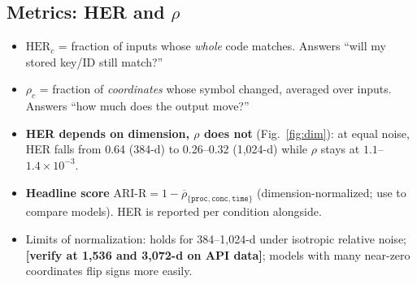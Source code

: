 \documentclass{article}
\newcommand{\todo}[1]{\textcolor{sTwo}{\textbf{[#1]}}}
\begin{document}
\subsection{Metrics: HER and $\rho$}\label{sec:metrics}
\begin{itemize}
  \item $\mathrm{HER}_c$ = fraction of inputs whose \emph{whole} code matches. Answers ``will my stored key/ID still match?''
  \item $\rho_c$ = fraction of \emph{coordinates} whose symbol changed, averaged over inputs. Answers ``how much does the output move?''
  \item \textbf{HER depends on dimension, $\rho$ does not} (Fig.~\ref{fig:dim}): at equal noise, HER falls from 0.64 (384-d) to 0.26--0.32 (1{,}024-d) while $\rho$ stays at $1.1$--$1.4\times10^{-3}$.
  \item \textbf{Headline score} $\text{ARI-R} = 1 - \overline{\rho}_{\{\texttt{proc},\texttt{conc},\texttt{time}\}}$ (dimension-normalized; use to compare models). HER is reported per condition alongside.
  \item Limits of normalization: holds for 384--1{,}024-d under isotropic relative noise; \todo{verify at 1{,}536 and 3{,}072-d on API data}; models with many near-zero coordinates flip signs more easily.
\end{itemize}
\end{document}
